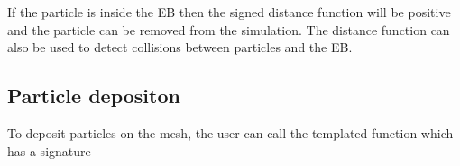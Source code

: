 \documentclass[letterpaper,10pt,english]{sphinxmanual}
\begin{document}
\sphinxAtStartPar
If the particle is inside the EB then the signed distance function will be positive and the particle can be removed from the simulation.
The distance function can also be used to detect collisions between particles and the EB.


\subsection{Particle depositon}
\label{\detokenize{Source/Particles:particle-depositon}}
\sphinxAtStartPar
To deposit particles on the mesh, the user can call the templated function  which has a signature

\begin{sphinxVerbatim}[commandchars=\\\{\},formatcom=\scriptsize]
     
               
                                 
                          
                        
                               
                         
                                         


\end{sphinxVerbatim}
\end{document}
